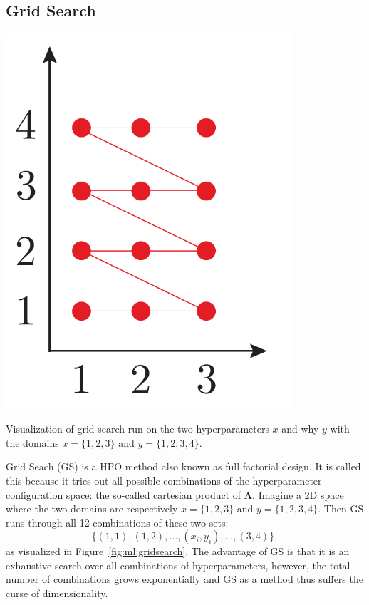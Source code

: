 \documentclass[a4paper, twoside, nobib]{tufte-book}
\begin{document}
\subsection{Grid Search}
\label{subsec:ml:grid_search}

\begin{marginfigure}
  \includegraphics[width=0.8\textwidth]{figures/gridsearch/grid.pdf}
  \caption[Grid Search]{Visualization of grid search run on the two hyperparameters $x$ and why $y$ with the domains $x=\{1, 2, 3\}$ and $y=\{1, 2, 3,4\}$.}
  \label{fig:ml:gridsearch}
\end{marginfigure}

Grid Seach (GS) is a HPO method also known as full factorial design. It is called this because it tries out all possible combinations of the hyperparameter configuration space: the so-called cartesian product of $\bm{\Lambda}$. Imagine a 2D space where the two domains are respectively $x=\{1, 2, 3\}$ and $y=\{1, 2, 3,4\}$. Then GS runs through all \num{12} combinations of these two sets: 
\begin{equation}
  \{(1, 1), (1, 2), \dots, (x_i, y_i), \dots, (3, 4)\},
\end{equation}
as visualized in Figure~\ref{fig:ml:gridsearch}. The advantage of GS is that it is an exhaustive search over all combinations of hyperparameters, however, the total number of combinations grows exponentially and GS as a method thus suffers the curse of dimensionality.
\end{document}
